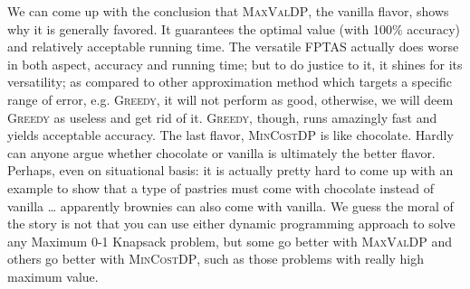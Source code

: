 \documentclass[12pt, oneside]{book}
\begin{document}
We can come up with the conclusion that \textsc{MaxValDP}, the vanilla
flavor, shows why it is generally favored. It guarantees the optimal
value (with 100\% accuracy) and relatively acceptable running time. The
versatile \textsc{FPTAS} actually does worse in both aspect, accuracy
and running time; but to do justice to it, it shines for its
versatility; as compared to other approximation method which targets a
specific range of error, e.g. \textsc{Greedy}, it will not perform as
good, otherwise, we will deem \textsc{Greedy} as useless and get rid of
it. \textsc{Greedy}, though, runs amazingly fast and yields acceptable
accuracy. The last flavor, \textsc{MinCostDP} is like chocolate. Hardly
can anyone argue whether chocolate or vanilla is ultimately the better
flavor. Perhaps, even on situational basis: it is actually pretty hard
to come up with an example to show that a type of pastries must come
with chocolate instead of vanilla \ldots{} apparently brownies can also
come with vanilla. We guess the moral of the story is not that you can
use either dynamic programming approach to solve any Maximum 0-1
Knapsack problem, but some go better with \textsc{MaxValDP} and others
go better with \textsc{MinCostDP}, such as those problems with really
high maximum value.


\end{document}
